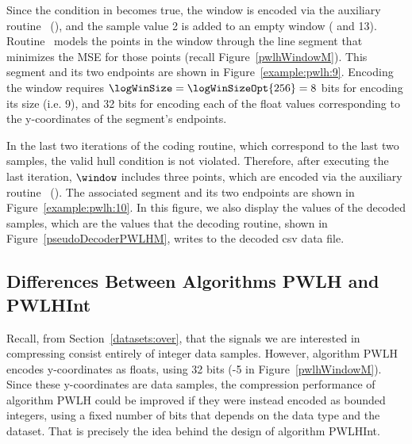 

\clearpage


Since the condition in  becomes true, the window is encoded via the auxiliary routine \EncodeWindow\ (), and the sample value 2 is added to an empty window ( and 13). Routine \EncodeWindow\ models the points in the window through the line segment that minimizes the MSE for those points (recall Figure~\ref{pwlhWindowM}). This segment and its two endpoints are shown in Figure~\ref{example:pwlh:9}. Encoding the window requires $\logWinSize = \logWinSizeOpt{256}=8$ bits for encoding its size (i.e. 9), and 32 bits for encoding each of the float values corresponding to the y-coordinates of the segment's endpoints.




In the last two iterations of the coding routine, which correspond to the last two samples, the valid hull condition is not violated. Therefore, after executing the last iteration, $\window$ includes three points, which are encoded via the auxiliary routine \EncodeLastWindowCA\ (). The associated segment and its two endpoints are shown in Figure~\ref{example:pwlh:10}. In this figure, we also display the values of the decoded samples, which are the values that the decoding routine, shown in Figure~\ref{pseudoDecoderPWLHM}, writes to the decoded csv data file. 






\clearpage
\subsection{Differences Between Algorithms PWLH and PWLHInt}
\label{algo:pwhl:int}


Recall, from Section~\ref{datasets:over}, that the signals we are interested in compressing consist entirely of integer data samples. However, algorithm PWLH encodes y-coordinates as floats, using 32 bits (-5 in Figure~\ref{pwlhWindowM}). Since these y-coordinates are data samples, the compression performance of algorithm PWLH could be improved if they were instead encoded as bounded integers, using a fixed number of bits that depends on the data type and the dataset. That is precisely the idea behind the design of algorithm PWLHInt.


